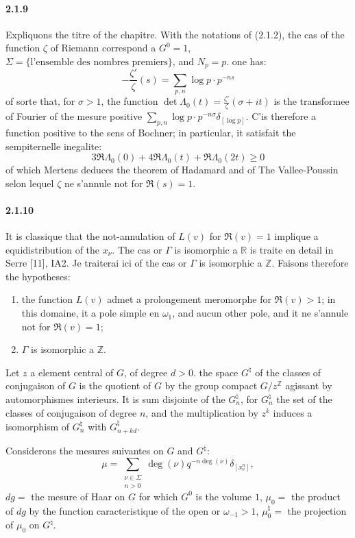 \documentclass[12pt,a4paper]{article}
\theoremstyle{plain}
\theoremstyle{definition}
\theoremstyle{remark}
\newcommand{\RR}{{\mathbb{R}}}
\newcommand{\ZZ}{{\mathbb{Z}}}
\begin{document}
\paragraph{2.1.9}
Expliquons the titre of the chapitre. With the notations of (2.1.2), the cas of the function $\zeta$ of Riemann correspond a $G^0 = 1$, $\Sigma = \{\text{l'ensemble des nombres premiers}\}$, and $N_p = p$. one has:
\[ -\frac{\zeta'}{\zeta}(s) = \sum_{p,n} \log p \cdot p^{-ns} \]
of sorte that, for $\sigma > 1$, the function $\det \Lambda_0(t) = \frac{\zeta'}{\zeta}(\sigma + it)$ is the transformee of Fourier of the mesure positive $\sum_{p,n} \log p \cdot p^{-n\sigma} \delta_{[\log p]}$. C'is therefore a function positive to the sens of Bochner; in particular, it satisfait the sempiternelle inegalite:
\[ 3\Re \Lambda_0(0) + 4\Re \Lambda_0(t) + \Re \Lambda_0(2t) \geq 0 \]
of which Mertens deduces the theorem of Hadamard and of The Vallee-Poussin selon lequel $\zeta$ ne s'annule not for $\Re(s) = 1$.


\paragraph{2.1.10}
It is classique that the not-annulation of $L(v)$ for $\Re(v) = 1$ implique a equidistribution of the $x_\nu$. The cas or $\Gamma$ is isomorphic a $\RR$ is traite en detail in Serre [11], IA2. Je traiterai ici of the cas or $\Gamma$ is isomorphic a $\ZZ$. Faisons therefore the hypotheses:
\begin{enumerate}[label=(\Alph*)]
\item[(C)] the function $L(v)$ admet a prolongement meromorphe for $\Re(v) > 1$; in this domaine, it a pole simple en $\omega_1$, and aucun other pole, and it ne s'annule not for $\Re(v) = 1$;
\item[(D)] $\Gamma$ is isomorphic a $\ZZ$.
\end{enumerate}

Let $z$ a element central of $G$, of degree $d > 0$. the space $G^\natural$ of the classes of conjugaison of $G$ is the quotient of $G$ by the group compact $G/z^\ZZ$ agissant by automorphismes interieurs. It is sum disjointe of the $G_n^\natural$, for $G_n^\natural$ the set of the classes of conjugaison of degree $n$, and the multiplication by $z^k$ induces a isomorphism of $G_n^\natural$ with $G_{n+kd}^\natural$.

Considerons the mesures suivantes on $G$ and $G^\natural$:
\[ \mu = \sum_{\substack{\nu \in \Sigma \\ n > 0}} \deg(\nu) q^{-n \deg(\nu)} \delta_{[x_\nu^n]}, \]
$dg =$ the mesure of Haar on $G$ for which $G^0$ is the volume $1$,
$\mu_0 =$ the product of $dg$ by the function caracteristique of the open or $\omega_{-1} > 1$,
$\mu_0^\natural =$ the projection of $\mu_0$ on $G^\natural$.
\end{document}
